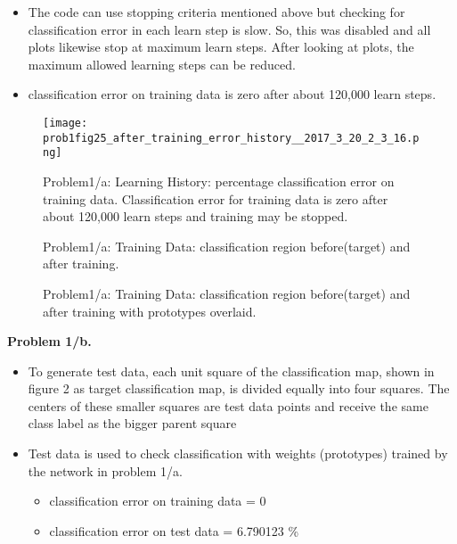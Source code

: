\documentclass[epsfig]{article}
\def\bpar{\vskip26pt}
\def\spar{\vskip10pt}
\begin{document}
\spar
\begin{itemize}
	\item  The code can use stopping criteria mentioned above but checking for classification error in each learn step is slow. So, this was disabled and all plots likewise stop at maximum learn steps. After looking at plots, the maximum allowed learning steps can be reduced.
	\item classification error on training data is zero after about 120,000 learn steps.
\end{itemize}
\newpage
\begin{figure}[h!]
	\caption{Problem1/a: Learning History: percentage classification error on training data. Classification error for training data is zero after about 120,000 learn steps and training may be stopped.}
	\texttt{[image: prob1fig25\_after\_training\_error\_history\_\_2017\_3\_20\_2\_3\_16.png]}
\end{figure}

\begin{figure}
	\caption{Problem1/a: Training Data: classification region before(target) and after training.}
	\begin{subfigmatrix}{2}
	\end{subfigmatrix}
\end{figure}


\begin{figure}
	\caption{Problem1/a: Training Data: classification region before(target) and after training with prototypes overlaid.}
	\begin{subfigmatrix}{2}
	\end{subfigmatrix}
\end{figure}
%
%
%
%
%
%
\clearpage

\bpar
{\bf Problem 1/b.}
\spar
%
%
%
\begin{itemize}
	\item To generate test data, each unit square of the classification map, shown in figure 2 as target classification map,  is divided equally into four squares. The centers of these smaller squares are test data points and receive the same class label as the bigger parent square
	\item Test data is used to check classification with weights (prototypes) trained by the network in problem 1/a.
		\begin{itemize}
			\item classification error on training data = 0
			\item classification error on test data = 6.790123 \%
		\end{itemize}
\end{itemize}
\end{document}
